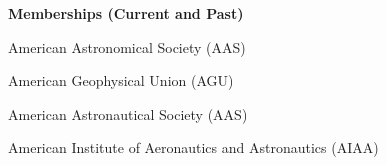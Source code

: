 \documentclass[margin,line]{res}
\newlength{\myitemspacing}
\newenvironment{list_new}{
    \begin{list}{\scriptsize{$\bullet$}}{%
        \setlength{\itemsep}{0in}
        \setlength{\parsep}{\myitemspacing} \setlength{\parskip}{0in}
        \setlength{\topsep}{0in} \setlength{\partopsep}{0in} 
        \setlength{\leftmargin}{0.2in}
        }}
    {\end{list}
}
\newif\ifallpubs
\begin{document}
\begin{resume}
{\bf Memberships (Current and Past)}
\begin{list_new}
    \item American Astronomical Society (AAS)
    \item American Geophysical Union (AGU)
    \item American Astronautical Society (AAS)
    \item American Institute of Aeronautics and Astronautics (AIAA)
\end{list_new}

\begin{refsection}
\nocite{*}
\ifallpubs
\section{\sc Journal Articles}
\vspace{0.15in}
\printbibliography[heading=none]
\else
\fi
\end{refsection}

\begin{refsection}
\nocite{*}
\ifallpubs
\section{\sc Conference and Meeting Proceedings}
\vspace{0.15in}
\printbibliography[heading=none]
\else
\fi
\end{refsection}

\begin{refsection}
\nocite{*}
\ifallpubs
\section{\sc Invited Seminars and Talks}
\vspace{0.15in}
\printbibliography[heading=none]
\else
\fi
\end{refsection}

\end{resume}
\thispagestyle{lastpage}
\end{document}
